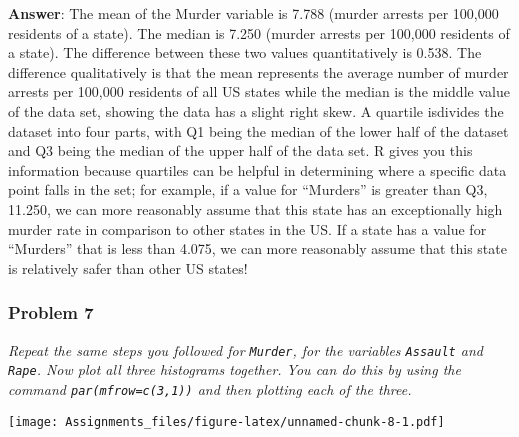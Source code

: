 \documentclass[
]{article}
\newenvironment{Shaded}{\begin{snugshade}}{\end{snugshade}}
\newcommand{\AttributeTok}[1]{\textcolor[rgb]{0.77,0.63,0.00}{#1}}
\newcommand{\FunctionTok}[1]{\textcolor[rgb]{0.00,0.00,0.00}{#1}}
\newcommand{\NormalTok}[1]{#1}
\newcommand{\SpecialCharTok}[1]{\textcolor[rgb]{0.00,0.00,0.00}{#1}}
\newcommand{\StringTok}[1]{\textcolor[rgb]{0.31,0.60,0.02}{#1}}
\begin{document}
\textbf{Answer}: The mean of the Murder variable is 7.788 (murder
arrests per 100,000 residents of a state). The median is 7.250 (murder
arrests per 100,000 residents of a state). The difference between these
two values quantitatively is 0.538. The difference qualitatively is that
the mean represents the average number of murder arrests per 100,000
residents of all US states while the median is the middle value of the
data set, showing the data has a slight right skew. A quartile isdivides
the dataset into four parts, with Q1 being the median of the lower half
of the dataset and Q3 being the median of the upper half of the data
set. R gives you this information because quartiles can be helpful in
determining where a specific data point falls in the set; for example,
if a value for ``Murders'' is greater than Q3, 11.250, we can more
reasonably assume that this state has an exceptionally high murder rate
in comparison to other states in the US. If a state has a value for
``Murders'' that is less than 4.075, we can more reasonably assume that
this state is relatively safer than other US states!

\hypertarget{problem-7}{%
\subsubsection{Problem 7}\label{problem-7}}

\emph{Repeat the same steps you followed for \texttt{Murder}, for the
variables \texttt{Assault} and \texttt{Rape}. Now plot all three
histograms together. You can do this by using the command
\texttt{par(mfrow=c(3,1))} and then plotting each of the three. }

\begin{Shaded}
\end{Shaded}

\texttt{[image: Assignments\_files/figure-latex/unnamed-chunk-8-1.pdf]}
\end{document}
